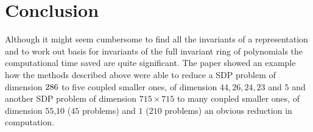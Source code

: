 \documentclass[]{article}
\begin{document}
\section*{Conclusion}
Although it might seem cumbersome to find all the invariants of a representation and to work out basis for invariants of the full invariant ring of polynomials the computational time saved are quite significant. The paper showed an example how the methods described above were able to reduce a SDP problem of dimension $286\time286$ to five coupled smaller ones, of dimension $44,26,24,23$ and $5$ and another SDP problem of dimension $715\times715$ to many coupled smaller ones, of dimension $55$,$10$ ($45$ problems) and $1$ ($210$ problems) an obvious reduction in computation.


\nocite{Gatermann_2004}

\printbibliography
\end{document}
